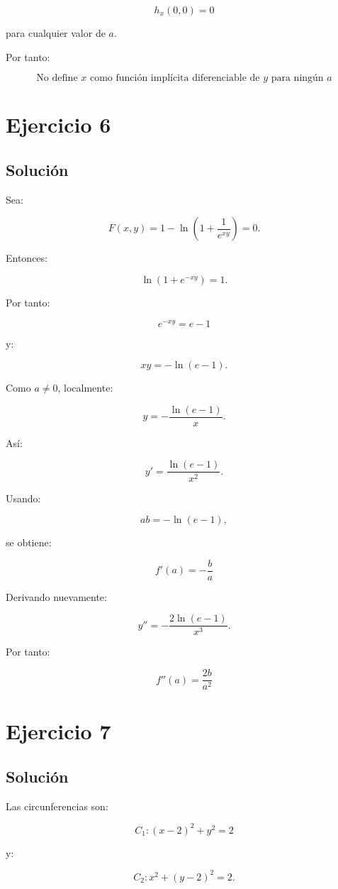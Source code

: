 \documentclass[11pt,a4paper]{article}
\begin{document}
\[
h_x(0,0)=0
\]

para cualquier valor de \(a\).

Por tanto:

\[
\boxed{
\text{No define }x\text{ como función implícita diferenciable de }y
\text{ para ningún }a
}
\]

\section{Ejercicio 6}
\subsection{Solución}

Sea:

\[
F(x,y)
=
1-\ln\left(
1+\frac1{e^{xy}}
\right)
=
0.
\]

Entonces:

\[
\ln(1+e^{-xy})=1.
\]

Por tanto:

\[
e^{-xy}=e-1
\]

y:

\[
xy=-\ln(e-1).
\]

Como \(a\neq0\), localmente:

\[
y
=
-\frac{\ln(e-1)}{x}.
\]

Así:

\[
y'
=
\frac{\ln(e-1)}{x^2}.
\]

Usando:

\[
ab=-\ln(e-1),
\]

se obtiene:

\[
\boxed{
f'(a)
=
-\frac ba
}
\]

Derivando nuevamente:

\[
y''
=
-\frac{2\ln(e-1)}{x^3}.
\]

Por tanto:

\[
\boxed{
f''(a)
=
\frac{2b}{a^2}
}
\]

\section{Ejercicio 7}
\subsection{Solución}

Las circunferencias son:

\[
C_1:
(x-2)^2+y^2=2
\]

y:

\[
C_2:
x^2+(y-2)^2=2.
\]
\end{document}

